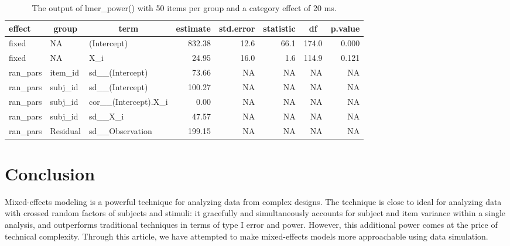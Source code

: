 \documentclass[english,doc,floatsintext]{apa6}
\begin{document}
\begin{table}[H]

\begin{center}
\begin{threeparttable}

\caption{\label{tab:lmer_power-new}The output of lmer\_power() with 50 items per group and a category effect of 20 ms.}

\small{

\begin{tabular}{lllrrrrr}
\toprule
effect & \multicolumn{1}{c}{group} & \multicolumn{1}{c}{term} & \multicolumn{1}{c}{estimate} & \multicolumn{1}{c}{std.error} & \multicolumn{1}{c}{statistic} & \multicolumn{1}{c}{df} & \multicolumn{1}{c}{p.value}\\
\midrule
fixed & NA & (Intercept) & 832.38 & 12.6 & 66.1 & 174.0 & 0.000\\
fixed & NA & X\_i & 24.95 & 16.0 & 1.6 & 114.9 & 0.121\\
ran\_pars & item\_id & sd\_\_(Intercept) & 73.66 & NA & NA & NA & NA\\
ran\_pars & subj\_id & sd\_\_(Intercept) & 100.27 & NA & NA & NA & NA\\
ran\_pars & subj\_id & cor\_\_(Intercept).X\_i & 0.00 & NA & NA & NA & NA\\
ran\_pars & subj\_id & sd\_\_X\_i & 47.57 & NA & NA & NA & NA\\
ran\_pars & Residual & sd\_\_Observation & 199.15 & NA & NA & NA & NA\\
\bottomrule
\end{tabular}

}

\end{threeparttable}
\end{center}

\end{table}

\hypertarget{conclusion}{%
\section{Conclusion}\label{conclusion}}

Mixed-effects modeling is a powerful technique for analyzing data from complex designs. The technique is close to ideal for analyzing data with crossed random factors of subjects and stimuli: it gracefully and simultaneously accounts for subject and item variance within a single analysis, and outperforms traditional techniques in terms of type I error and power. However, this additional power comes at the price of technical complexity. Through this article, we have attempted to make mixed-effects models more approachable using data simulation.
\end{document}
